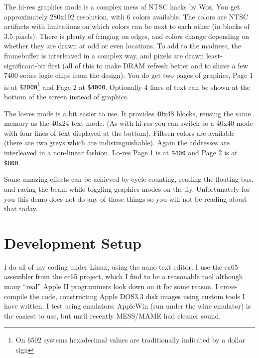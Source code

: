 \documentclass[twocolumn]{article}
\begin{document}
The hi-res graphics mode is a complex mess of NTSC hacks by Woz.
You get approximately 280x192 resolution, with 6 colors available.
The colors are NTSC artifacts with limitations 
on which colors can be next to each other (in blocks of 3.5 pixels).
There is plenty of fringing on edges, and colors change depending on
whether they are drawn at odd or even locations.
To add to the madness, the framebuffer is interleaved in a complex way,
and pixels are drawn least-significant-bit first (all of this to make
DRAM refresh better and to shave a few 7400 series logic chips from the design).
You do get two pages of graphics, Page 1 is at
{\tt \$2000}\footnote{On 6502 systems hexadecimal values are 
traditionally indicated by a dollar sign}
and Page 2 at {\tt \$4000}.
Optionally 4 lines of text can be shown at the bottom of the
screen instead of graphics.

The lo-res mode is a bit easier to use.  
It provides 40x48 blocks, reusing the same memory as the 40x24 text mode.
(As with hi-res you can switch to a 40x40 mode with four lines of
text displayed at the bottom).
Fifteen colors are available (there are two greys which are indistinguishable).
Again the addresses are interleaved in a non-linear fashion.
Lo-res Page 1 is at {\tt \$400} and Page 2 is at {\tt \$800}.

Some amazing effects can be achieved by cycle counting, reading
the floating bus, and racing the beam while toggling graphics
modes on the fly.
Unfortunately for you this demo does not do any of those things
so you will not be reading about that today.




\section{Development Setup}

I do all of my coding under Linux, using the nano text editor.
I use the ca65 assembler from the cc65 project, which I find to be a reasonable
tool although many ``real'' Apple II programmers look down on it for some
reason.
I cross-compile the code, constructing Apple DOS3.3 disk images using
custom tools I have written.
I test using emulators:
AppleWin (run under the wine emulator) is the easiest to use, but
until recently MESS/MAME had cleaner sound.
\end{document}
